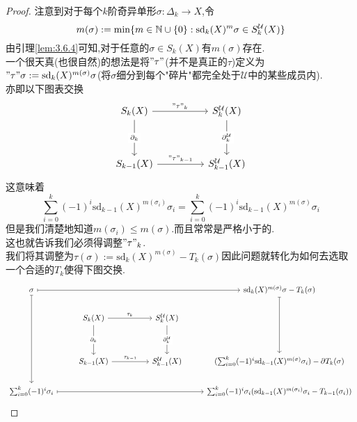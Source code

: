 \documentclass{article}
\begin{document}
\begin{proof}
    注意到对于每个$k$阶奇异单形$\sigma : \Delta_k \to X$,令
    $$
    m(\sigma):=\min \{m \in \mathbb{N} \cup \{0\}: \text{sd}_k(X)^m \sigma \in S_k^\mathcal{U}(X)\}
    $$
    由引理\ref{lem:3.6.4}可知,对于任意的$\sigma \in S_k(X)$有$m(\sigma)$存在.\\
    一个很天真(也很自然)的想法是将$"\tau"$(并不是真正的$\tau$)定义为$"\tau"\sigma := \text{sd}_k(X)^{m(\sigma)}\sigma$(将$\sigma$细分到每个"碎片"都完全处于$\mathcal{U}$中的某些成员内).\\亦即以下图表交换
    \[\begin{tikzcd}
        {S_k(X)} && {S_k^\mathcal{U}(X)} \\
        \\
        {S_{k-1}(X)} && {S_{k-1}^\mathcal{U}(X)}
        \arrow["{"\tau"_k}", from=1-1, to=1-3]
        \arrow["{"\tau"_{k-1}}", from=3-1, to=3-3]
        \arrow["{\partial_k}"{description}, from=1-1, to=3-1]
        \arrow["{\partial_k^\mathcal{U}}"{description}, from=1-3, to=3-3]
    \end{tikzcd}\]
    这意味着
    $$
    \sum_{i= 0}^k(-1)^i \text{sd}_{k-1}(X)^{m(\sigma_i)}\sigma_i = \sum_{i = 0}^k(-1)^i \text{sd}_{k-1}(X)^{m(\sigma)}\sigma_i
    $$
    但是我们清楚地知道$m(\sigma_i)\leq m(\sigma)$.而且常常是严格小于的.\\
    这也就告诉我们必须得调整$"\tau"_k$.\\
    我们将其调整为$\tau(\sigma) := \text{sd}_k(X)^{m(\sigma)} - T_k(\sigma)$因此问题就转化为如何去选取一个合适的$T_k$使得下图交换.
    \[\begin{tikzcd}
        \sigma &&&& {\text{sd}_k(X)^{m(\sigma)}\sigma-T_k(\sigma)} \\
        & {S_k(X)} && {S_k^\mathcal{U}(X)} \\
        \\
        & {S_{k-1}(X)} && {S_{k-1}^\mathcal{U}(X)} & {(\sum_{i=0}^k(-1)^i\text{sd}_{k-1}(X)^{m(\sigma)}\sigma_i)-\partial T_k(\sigma)} \\
        {\sum_{i = 0}^k(-1)^i \sigma_i} &&&& {\sum_{i = 0}^k(-1)^i \sigma_i(\text{sd}_{k-1}(X)^{m(\sigma_i)}\sigma_i-T_{k-1}(\sigma_i))}
        \arrow["{\tau_k}", from=2-2, to=2-4]
        \arrow["{\tau_{k-1}}", from=4-2, to=4-4]
        \arrow["{\partial_k}"{description}, from=2-2, to=4-2]
        \arrow["{\partial_k^\mathcal{U}}"{description}, from=2-4, to=4-4]
        \arrow[maps to, from=5-1, to=5-5]
        \arrow[maps to, from=1-5, to=4-5]
        \arrow[maps to, from=1-1, to=1-5]
        \arrow[maps to, from=1-1, to=5-1]

\end{tikzcd}\]
\end{proof}
\end{document}
